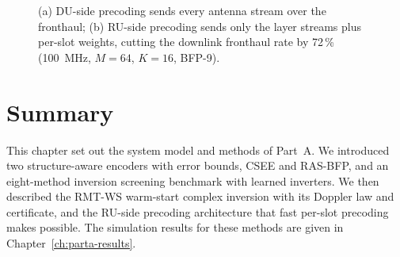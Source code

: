 \begin{figure}[H]
\centering
{}
\caption{(a) DU-side precoding sends every antenna stream over the fronthaul; (b) RU-side precoding sends only the layer streams plus per-slot weights, cutting the downlink fronthaul rate by 72\,\% (100~MHz, $M=64$, $K=16$, BFP-9).}
\label{fig:ru-prec}
\end{figure}

\section{Summary}

This chapter set out the system model and methods of Part~A. We introduced two structure-aware encoders with error bounds, CSEE and RAS-BFP, and an eight-method inversion screening benchmark with learned inverters. We then described the RMT-WS warm-start complex inversion with its Doppler law and certificate, and the RU-side precoding architecture that fast per-slot precoding makes possible. The simulation results for these methods are given in Chapter~\ref{ch:parta-results}.
